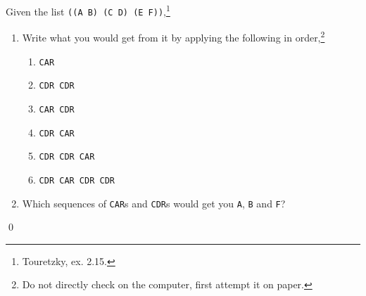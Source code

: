 \documentclass[a4paper,11pt]{article}
\begin{document}
\begin{uexercise}
Given the list \Verb+((A B) (C D) (E F))+,\footnote{Touretzky, ex. 2.15.} 

\begin{enumerate}
\item Write what you would get from it by applying the following in order,\footnote{Do not directly check on the computer, first attempt it on paper.}
	\begin{enumerate}
	\item \Verb+CAR+
	\item \Verb+CDR CDR+
	\item \Verb+CAR CDR +
	\item \Verb+CDR CAR +
	\item \Verb+CDR CDR CAR +
	\item \Verb+CDR CAR CDR CDR +
	\end{enumerate}

\item Which sequences of \Verb+CAR+s and \Verb+CDR+s would get you \Verb+A+, \Verb+B+ and \Verb+F+?
\end{enumerate}

\qed
\end{uexercise}
\end{document}
